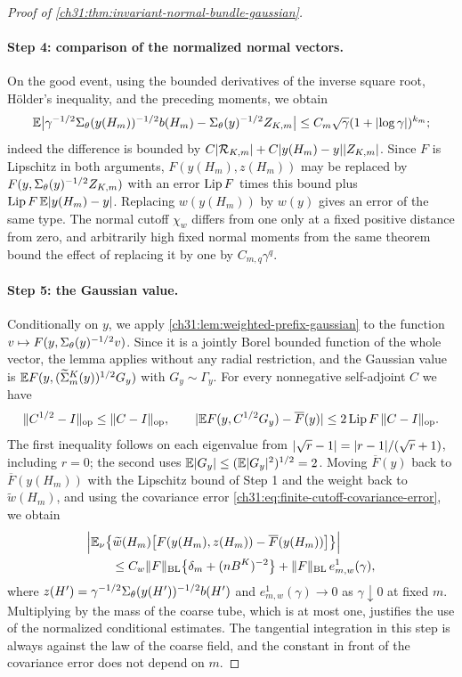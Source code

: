 \begin{proof}[Proof of \cref{ch31:thm:invariant-normal-bundle-gaussian}]
\paragraph{Step 4: comparison of the normalized normal vectors.}
On the good event, using the bounded derivatives of the inverse square root, H\"older's inequality, and the preceding moments, we obtain
\[
 \mathbb E\bigl\lvert\gamma^{-1/2}\Sigma_\theta(y(H_m))^{-1/2}b(H_m)-\Sigma_\theta(y)^{-1/2}Z_{K,m}\bigr\rvert\le C_m\sqrt\gamma(1+\lvert \log\gamma\rvert)^{k_m};
\]
indeed the difference is bounded by $C\lvert \mathcal R_{K,m}\rvert+C\lvert y(H_m)-y\rvert\lvert Z_{K,m}\rvert$. Since $F$ is Lipschitz in both arguments, $F(y(H_m),z(H_m))$ may be replaced by $F(y,\Sigma_\theta(y)^{-1/2}Z_{K,m})$ with an error $\operatorname{Lip} F$ times this bound plus $\operatorname{Lip} F\,\mathbb E\lvert y(H_m)-y\rvert$. Replacing $w(y(H_m))$ by $w(y)$ gives an error of the same type. The normal cutoff $\chi_w$ differs from one only at a fixed positive distance from zero, and arbitrarily high fixed normal moments from the same theorem bound the effect of replacing it by one by $C_{m,q}\gamma^q$.

\paragraph{Step 5: the Gaussian value.}
Conditionally on $y$, we apply \cref{ch31:lem:weighted-prefix-gaussian} to the function $v\mapsto F(y,\Sigma_\theta(y)^{-1/2}v)$. Since it is a jointly Borel bounded function of the whole vector, the lemma applies without any radial restriction, and the Gaussian value is $\mathbb E F(y,(\widetilde\Sigma_m^K(y))^{1/2}G_y)$ with $G_y\sim\Gamma_y$. For every nonnegative self-adjoint $C$ we have
\[
 \lVert C^{1/2}-I\rVert_{\rm op}\le\lVert C-I\rVert_{\rm op},\qquad\lvert \mathbb E F(y,C^{1/2}G_y)-\overline F(y)\rvert\le2\operatorname{Lip} F\,\lVert C-I\rVert_{\rm op}.
\]
The first inequality follows on each eigenvalue from $\lvert \sqrt r-1\rvert=\lvert r-1\rvert/(\sqrt r+1)$, including $r=0$; the second uses $\mathbb E\lvert G_y\rvert\le(\mathbb E\lvert G_y\rvert^2)^{1/2}=2$. Moving $\overline F(y)$ back to $\overline F(y(H_m))$ with the Lipschitz bound of Step 1 and the weight back to $\widetilde w(H_m)$, and using the covariance error \eqref{ch31:eq:finite-cutoff-covariance-error}, we obtain
\begin{equation}\label{ch31:eq:normal-bundle-prefix}
 \begin{split}
 &\Bigl\lvert\mathbb E_\nu\bigl\{\widetilde w(H_m)\bigl[F(y(H_m),z(H_m))-\overline F(y(H_m))\bigr]\bigr\}\Bigr\rvert\\
 &\qquad\le C_w\lVert F\rVert_{\rm BL}\bigl\{\delta_m+(nB^K)^{-2}\bigr\}+\lVert F\rVert_{\rm BL}\,e^{1}_{m,w}(\gamma),
 \end{split}
\end{equation}
where $z(H')=\gamma^{-1/2}\Sigma_\theta(y(H'))^{-1/2}b(H')$ and $e^1_{m,w}(\gamma)\to0$ as $\gamma\downarrow0$ at fixed $m$. Multiplying by the mass of the coarse tube, which is at most one, justifies the use of the normalized conditional estimates. The tangential integration in this step is always against the law of the coarse field, and the constant in front of the covariance error does not depend on $m$.


\end{proof}
